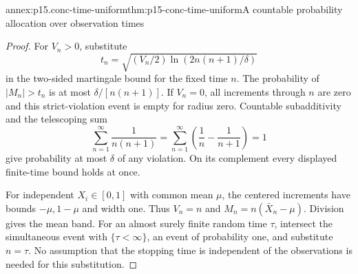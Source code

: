 \begin{annexitem}{annex:p15.conc-time-uniform}{thm:p15-conc-time-uniform}{A countable probability allocation over observation times}
\begin{proof}
For \(V_n>0\), substitute
\[
          t_n=\sqrt{(V_n/2)\ln(2n(n+1)/\delta)}
\]
in the two-sided martingale bound for the fixed time \(n\).
The probability of \(|M_n|>t_n\) is at most
\(\delta/[n(n+1)]\). If \(V_n=0\), all increments
through \(n\) are zero and this strict-violation event
is empty for radius zero.
Countable subadditivity and the telescoping sum
\[
       \sum_{n=1}^{\infty}\frac{1}{n(n+1)}
          =\sum_{n=1}^{\infty}\left(\frac1n-\frac1{n+1}\right)=1
\]
give probability at most \(\delta\) of any violation.
On its complement every displayed finite-time bound
holds at once.

For independent \(X_i\in[0,1]\) with common mean \(\mu\),
the centered increments have bounds \(-\mu,1-\mu\)
and width one. Thus \(V_n=n\) and
\(M_n=n(\bar X_n-\mu)\). Division gives the mean band.
For an almost surely finite random time \(\tau\),
intersect the simultaneous event with \(\{\tau<\infty\}\),
an event of probability one, and substitute \(n=\tau\).
No assumption that the stopping time is independent
of the observations is needed for this substitution.
\end{proof}
\end{annexitem}
